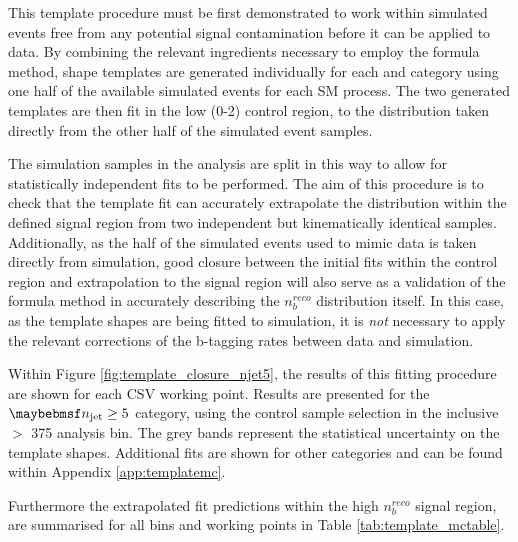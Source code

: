 This template procedure must be first demonstrated to work within simulated events free from any potential signal contamination before it can be applied to data. By combining the relevant ingredients necessary to employ the formula method, \nbreco shape templates are generated individually for each \njet and \theht category using one half of the available simulated events for each \ac{SM} process. The two generated templates are then fit in the low \nbreco (0-2) control region, to the \nbreco distribution taken directly from the other half of the simulated event samples. 

The simulation samples in the analysis are split in this way to allow for statistically independent fits to be performed. The aim of this procedure is to check that the template fit can accurately extrapolate the \nbreco distribution within the defined signal region from two independent but kinematically identical samples. Additionally, as the half of the simulated events used to mimic data is taken directly from simulation, good closure between the initial fits within the control region and extrapolation to the signal region will also serve as a validation of the formula method in accurately describing the $n_{b}^{reco}$ distribution itself. In this case, as the template shapes are being fitted to simulation, it is \emph{not} necessary to apply the relevant corrections of the b-tagging rates between data and simulation. 

Within Figure \ref{fig:template_closure_njet5}, the results of this fitting procedure are shown for each \ac{CSV} working point. Results are presented for the $\njet \geq 5$ category, using the \mupjets control sample selection in the inclusive \theht$>$ 375 \GeV analysis bin. The grey bands represent the statistical uncertainty on the template shapes. Additional fits are shown for other \njet categories and can be found within Appendix \ref{app:templatemc}. 

Furthermore the extrapolated fit predictions within the high $n_{b}^{reco}$ signal region, are summarised for all \theht bins and working points in Table \ref{tab:template_mctable}. 


